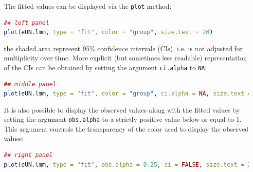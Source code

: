 \documentclass[12pt]{article}
\newcommand\Warning[1][3ex]{%
\renewcommand\stacktype{L}%
\scaleto{\stackon[1.3pt]{\color{red}$\triangle$}{\tiny\bfseries !}}{#1}%
\xspace
}
\begin{document}
The fitted values can be displayed via the \texttt{plot} method:
\begin{lstlisting}[language=r,numbers=none]
## left panel
plot(eUN.lmm, type = "fit", color = "group", size.text = 20)
\end{lstlisting}

\Warning the shaded area represent 95\% confidence intervals (CIs),
  i.e. is not adjusted for multiplicity over time. More explicit (but
  sometimes less readable) representation of the CIs can be obtained
  by setting the argument \texttt{ci.alpha} to \texttt{NA}:

\begin{lstlisting}[language=r,numbers=none]
## middle panel
plot(eUN.lmm, type = "fit", color = "group", ci.alpha = NA, size.text = 20)
\end{lstlisting}

\noindent It is also possible to display the observed values along with the
fitted values by setting the argument \texttt{obs.alpha} to a strictly
positive value below or equal to 1. This argument controls the
transparency of the color used to display the observed values:
\begin{lstlisting}[language=r,numbers=none]
## right panel
plot(eUN.lmm, type = "fit", obs.alpha = 0.25, ci = FALSE, size.text = 20)
\end{lstlisting}
\end{document}
